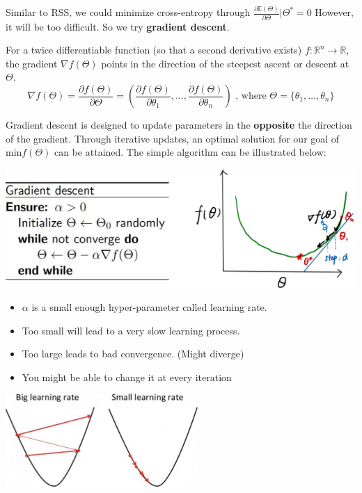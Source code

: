 \documentclass[letterpaper,12pt]{article}
\begin{document}
Similar to RSS, we could minimize cross-entropy through $\frac{\partial
        \mathbb{E}(\Theta)}{\partial \Theta}|\Theta^*=0$ However, it will be too
difficult. So we try \textbf{gradient descent}.

For a twice differentiable function (so that a second derivative exists)
$f:\mathbb{R}^n\rightarrow\mathbb{R}$, the gradient $\nabla f(\Theta)$ points
in the direction of the steepest ascent or descent at $\Theta$.
\[
    \nabla f(\Theta)=\frac{\partial f(\Theta)}{\partial \Theta} = (\frac{\partial f(\Theta)}{\partial \theta_1}, \ldots, \frac{\partial f(\Theta)}{\partial \theta_n})   \text{ , where }\Theta = \{\theta_1,\ldots,\theta_n\}
\]

Gradient descent is designed to update parameters in the \textbf{opposite}
the direction of the gradient. Through iterative updates, an optimal solution for
our goal of min$f(\Theta)$ can be attained. The simple algorithm can be
illustrated below:

\includegraphics{Image/Gradient descent.png}

\begin{itemize}
    \item $\alpha$ is a small enough hyper-parameter called learning rate.
    \item Too small will lead to a very slow learning process.
    \item Too large leads to bad convergence. (Might diverge)
    \item You might be able to change it at every iteration
\end{itemize}

\includegraphics{./Image/learning rate for gradient descent.png}
\end{document}
